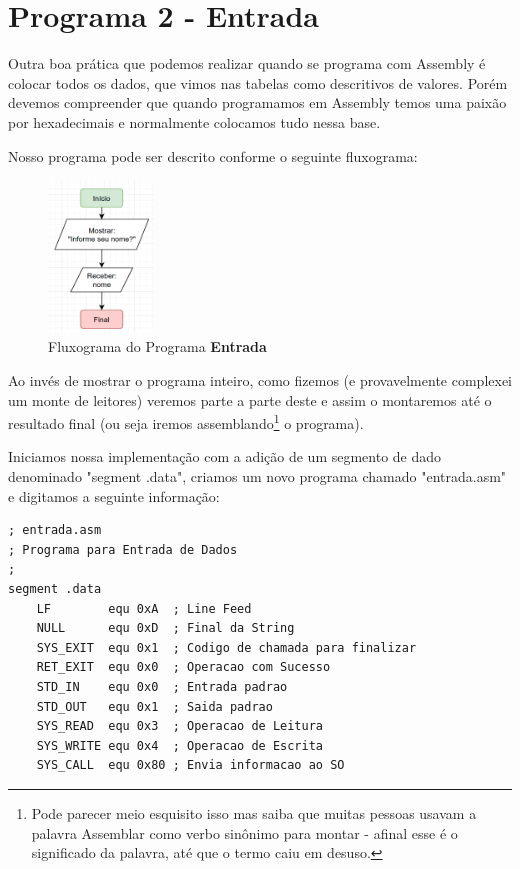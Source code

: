\section{Programa 2 - Entrada}
Outra boa prática que podemos realizar quando se programa com Assembly é colocar todos os dados, que vimos nas tabelas como descritivos de valores. Porém devemos compreender que quando programamos em Assembly temos uma paixão por hexadecimais e normalmente colocamos tudo nessa base.

Nosso programa pode ser descrito conforme o seguinte fluxograma:
\begin{figure}[H]
	\centering
	\includegraphics[width=0.25\textwidth]{Pictures/cap01/programa2}
	\caption{Fluxograma do Programa \textbf{Entrada}}
\end{figure}

Ao invés de mostrar o programa inteiro, como fizemos (e provavelmente complexei um monte de leitores) veremos parte a parte deste e assim o montaremos até o resultado final (ou seja iremos assemblando\footnote{Pode parecer meio esquisito isso mas saiba que muitas pessoas usavam a palavra Assemblar como verbo sinônimo para montar - afinal esse é o significado da palavra, até que o termo caiu em desuso.} o programa).

Iniciamos nossa implementação com a adição de um segmento de dado denominado "segment .data", criamos um novo programa chamado "entrada.asm" e digitamos a seguinte informação:
\begin{lstlisting}[]
; entrada.asm	
; Programa para Entrada de Dados
;
segment .data
	LF        equ 0xA  ; Line Feed
	NULL      equ 0xD  ; Final da String
	SYS_EXIT  equ 0x1  ; Codigo de chamada para finalizar
	RET_EXIT  equ 0x0  ; Operacao com Sucesso
	STD_IN    equ 0x0  ; Entrada padrao
	STD_OUT   equ 0x1  ; Saida padrao
	SYS_READ  equ 0x3  ; Operacao de Leitura
	SYS_WRITE equ 0x4  ; Operacao de Escrita
	SYS_CALL  equ 0x80 ; Envia informacao ao SO
\end{lstlisting}

